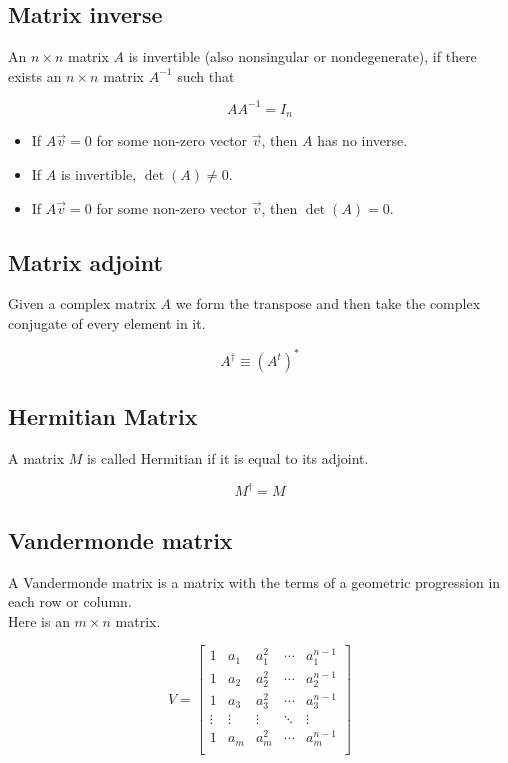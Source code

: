 \documentclass{article}
\begin{document}

\subsection{Matrix inverse}

An \(n \times n\) matrix \(A\) is invertible (also nonsingular or nondegenerate),
if there exists an \(n \times n\) matrix \(A^{-1}\) such that

\[
    AA^{-1}=I_n
\]

\begin{itemize}
    \item If \(A\vec{v}=0\) for some non-zero vector \(\vec{v}\), then \(A\) has no inverse.
    \item If \(A\) is invertible, \(\det(A)\neq 0\).
    \item If \(A\vec{v}=0\) for some non-zero vector \(\vec{v}\), then \(\det(A)=0\).
\end{itemize}

\pagebreak

\subsection{Matrix adjoint}

Given a complex matrix \(A\) we form the transpose and then take the complex conjugate of every element in it.

\[
    A^\dagger \equiv {\left(A^t\right)}^{*}
\]

\subsection{Hermitian Matrix}

A matrix \(M\) is called Hermitian if it is equal to its adjoint.

\[
    M^\dagger = M
\]

\subsection{Vandermonde matrix}

A Vandermonde matrix is a matrix with the terms of a geometric progression in each row or column. \\
Here is an \(m \times n\) matrix.

\[
    V =
    \begin{bmatrix}
        1 & a_1 & a_1^2 & \cdots & a_1^{n-1} \\
        1 & a_2 & a_2^2 & \cdots & a_2^{n-1} \\
        1 & a_3 & a_3^2 & \cdots & a_3^{n-1} \\
        \vdots & \vdots & \vdots & \ddots & \vdots \\
        1 & a_m & a_m^2 & \cdots & a_m^{n-1} \\
    \end{bmatrix}
\]
\end{document}
